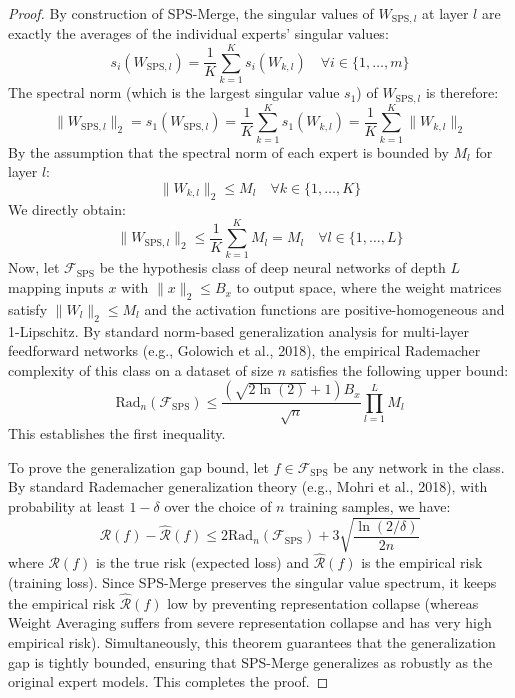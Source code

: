 \documentclass{article}
\theoremstyle{plain}
\theoremstyle{definition}
\theoremstyle{remark}
\begin{document}
\begin{proof}
By construction of SPS-Merge, the singular values of $W_{\text{SPS}, l}$ at layer $l$ are exactly the averages of the individual experts' singular values:
\begin{equation}
    s_i(W_{\text{SPS}, l}) = \frac{1}{K}\sum_{k=1}^K s_i(W_{k, l}) \quad \forall i \in \{1, \dots, m\}
\end{equation}
The spectral norm (which is the largest singular value $s_1$) of $W_{\text{SPS}, l}$ is therefore:
\begin{equation}
    \|W_{\text{SPS}, l}\|_2 = s_1(W_{\text{SPS}, l}) = \frac{1}{K}\sum_{k=1}^K s_1(W_{k, l}) = \frac{1}{K}\sum_{k=1}^K \|W_{k, l}\|_2
\end{equation}
By the assumption that the spectral norm of each expert is bounded by $M_l$ for layer $l$:
\begin{equation}
    \|W_{k, l}\|_2 \le M_l \quad \forall k \in \{1, \dots, K\}
\end{equation}
We directly obtain:
\begin{equation}
    \|W_{\text{SPS}, l}\|_2 \le \frac{1}{K} \sum_{k=1}^K M_l = M_l \quad \forall l \in \{1, \dots, L\}
\end{equation}
Now, let $\mathcal{F}_{\text{SPS}}$ be the hypothesis class of deep neural networks of depth $L$ mapping inputs $x$ with $\|x\|_2 \le B_x$ to output space, where the weight matrices satisfy $\|W_{l}\|_2 \le M_l$ and the activation functions are positive-homogeneous and 1-Lipschitz. By standard norm-based generalization analysis for multi-layer feedforward networks (e.g., Golowich et al., 2018), the empirical Rademacher complexity of this class on a dataset of size $n$ satisfies the following upper bound:
\begin{equation}
    \text{Rad}_n(\mathcal{F}_{\text{SPS}}) \le \frac{(\sqrt{2\ln(2)} + 1) B_x}{\sqrt{n}} \prod_{l=1}^L M_l
\end{equation}
This establishes the first inequality.

To prove the generalization gap bound, let $f \in \mathcal{F}_{\text{SPS}}$ be any network in the class. By standard Rademacher generalization theory (e.g., Mohri et al., 2018), with probability at least $1 - \delta$ over the choice of $n$ training samples, we have:
\begin{equation}
    \mathcal{R}(f) - \widehat{\mathcal{R}}(f) \le 2 \text{Rad}_n(\mathcal{F}_{\text{SPS}}) + 3 \sqrt{\frac{\ln(2/\delta)}{2n}}
\end{equation}
where $\mathcal{R}(f)$ is the true risk (expected loss) and $\widehat{\mathcal{R}}(f)$ is the empirical risk (training loss). Since SPS-Merge preserves the singular value spectrum, it keeps the empirical risk $\widehat{\mathcal{R}}(f)$ low by preventing representation collapse (whereas Weight Averaging suffers from severe representation collapse and has very high empirical risk). Simultaneously, this theorem guarantees that the generalization gap is tightly bounded, ensuring that SPS-Merge generalizes as robustly as the original expert models.
This completes the proof.
\end{proof}
\end{document}
